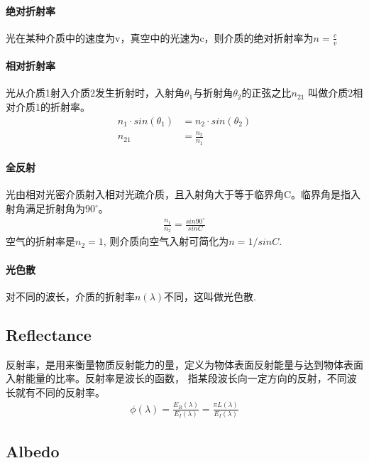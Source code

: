 \paragraph{绝对折射率}

光在某种介质中的速度为v，真空中的光速为c，则介质的绝对折射率为$n=\frac{c}{v}$

\paragraph{相对折射率}

光从介质1射入介质2发生折射时，入射角$\theta_{1}$与折射角$\theta_{2}$的正弦之比$n_{21}$
叫做介质2相对介质1的折射率。
\begin{align*}
    n_{1} \cdot sin(\theta_{1}) &= n_{2} \cdot sin(\theta_{2}) \\
    n_{21} &= \frac{n_{2}}{n_{1}}
\end{align*}

\paragraph{全反射}

光由相对光密介质射入相对光疏介质，且入射角大于等于临界角C。临界角是指入射角满足折射角为$90^{\circ}$。
\begin{align*}
    \frac{n_{1}}{n_{2}} = \frac{sin90^{\circ}}{sinC}
\end{align*}
空气的折射率是$n_{2}=1$, 则介质向空气入射可简化为$n=1/sinC$.

\paragraph{光色散}

对不同的波长，介质的折射率$n(\lambda)$不同，这叫做光色散.

\subsection{Reflectance}

反射率，是用来衡量物质反射能力的量，定义为物体表面反射能量与达到物体表面入射能量的比率。反射率是波长的函数，
指某段波长向一定方向的反射，不同波长就有不同的反射率。
\begin{align*}
    \phi(\lambda) = \frac{E_{R}(\lambda)}{E_{I}(\lambda)} = \frac{\pi L(\lambda)}{E_{I}(\lambda)}
\end{align*}

\subsection{Albedo}

